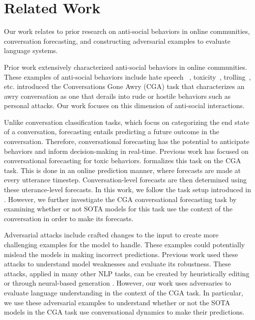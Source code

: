 \section{Related Work}
Our work relates to prior research on anti-social behaviors in online 
communities, conversation forecasting, and constructing adversarial examples
to evaluate language systems.

Prior work extensively characterized anti-social behaviors in online communities.
%
These examples of anti-social behaviors include hate speech ~\citep{rottger-etal-2021-hatecheck, elsherief-etal-2021-latent}, 
toxicity~\citep{pavlopoulos-etal-2020-toxicity, bespalov-etal-2023-towards}, trolling~\citep{mojica-de-la-vega-ng-2018-modeling, lee-etal-2022-elf22}, etc. 
%
\citep{zhang-etal-2018-conversations} introduced the Conversations Gone Awry (CGA)
task that characterizes an awry conversation as one that derails into rude or 
hostile behaviors such as personal attacks. 
%
Our work focuses on this dimension of anti-social interactions.

Unlike conversation classification tasks, which focus on categorizing the end 
state of a conversation, forecasting entails predicting a future outcome in 
the conversation. 
%
Therefore, conversational forecasting has the potential to anticipate behaviors 
and inform decision-making in real-time.
%
Previous work has focused on conversational forecasting for toxic behaviors\cite{}. 
%
\cite{chang-danescu-niculescu-mizil-2019-trouble} formalizes this task on the CGA 
task. 
%
This is done in an online prediction manner, where forecasts are made at every 
utterance timestep.
%
Conversation-level forecasts are then determined using these uterance-level forecasts.
%
In this work, we follow the task setup introduced in 
\cite{chang-danescu-niculescu-mizil-2019-trouble}.
%
However, we further investigate the CGA conversational forecasting task 
by examining whether or not SOTA models for this task use the context of 
the conversation in order to make its forecasts.


Adversarial attacks include crafted changes to the input to create more challenging
examples for the model to handle.
%
These examples could potentially mislead the models in making incorrect predictions.
%
Previous work used these attacks to understand model weaknesses and evaluate its 
robustness.
%
These attacks, applied in many other NLP tasks,  can be created by heuristically editing \cite{wang-bansal-2018-robust} or through neural-based generation \cite{iyyer-etal-2018-adversarial, khashabi-etal-2020-bang, bartolo-etal-2021-improving, fu-etal-2023-scene}.
%
However, our work uses adversaries to evaluate language understanding in the context of 
the CGA task. 
%
In particular, we use these adversarial examples to understand whether or not the 
SOTA models in the CGA task use conversational dynamics to make their predictions.
